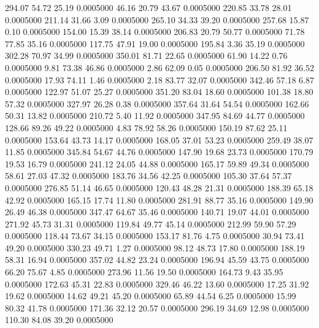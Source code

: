  294.07   54.72   25.19   0.0005000
  46.16   20.79   43.67   0.0005000
 220.85   33.78   28.01   0.0005000
 211.14   31.66    3.09   0.0005000
 265.10   34.33   39.20   0.0005000
 257.68   15.87    0.10   0.0005000
 154.00   15.39   38.14   0.0005000
 206.83   20.79   50.77   0.0005000
  71.78   77.85   35.16   0.0005000
 117.75   47.91   19.00   0.0005000
 195.84    3.36   35.19   0.0005000
 302.28   70.97   34.99   0.0005000
 350.01   81.71   22.65   0.0005000
  61.90   14.22    0.76   0.0005000
   9.81   73.38   46.86   0.0005000
   2.86   62.09    0.05   0.0005000
 206.50   81.92   36.52   0.0005000
  17.93   74.11    1.46   0.0005000
   2.18   83.77   32.07   0.0005000
 342.46   57.18    6.87   0.0005000
 122.97   51.07   25.27   0.0005000
 351.20   83.04   18.60   0.0005000
 101.38   18.80   57.32   0.0005000
 327.97   26.28    0.38   0.0005000
 357.64   31.64   54.54   0.0005000
 162.66   50.31   13.82   0.0005000
 210.72    5.40   11.92   0.0005000
 347.95   84.69   44.77   0.0005000
 128.66   89.26   49.22   0.0005000
   4.83   78.92   58.26   0.0005000
 150.19   87.62   25.11   0.0005000
 153.64   43.73   14.17   0.0005000
 168.05   37.01   53.23   0.0005000
 259.49   38.07   11.85   0.0005000
 345.84   54.67   44.76   0.0005000
 147.90   19.68   23.73   0.0005000
 170.79   19.53   16.79   0.0005000
 241.12   24.05   44.88   0.0005000
 165.17   59.89   49.34   0.0005000
  58.61   27.03   47.32   0.0005000
 183.76   34.56   42.25   0.0005000
 105.30   37.64   57.37   0.0005000
 276.85   51.14   46.65   0.0005000
 120.43   48.28   21.31   0.0005000
 188.39   65.18   42.92   0.0005000
 165.15   17.74   11.80   0.0005000
 281.91   88.77   35.16   0.0005000
 149.90   26.49   46.38   0.0005000
 347.47   64.67   35.46   0.0005000
 140.71   19.07   44.01   0.0005000
 271.92   45.73   31.31   0.0005000
 119.84   49.77   45.14   0.0005000
 212.99   59.90   57.29   0.0005000
 118.44   73.67   34.15   0.0005000
 153.17   81.76    4.75   0.0005000
  30.94   73.41   49.20   0.0005000
 330.23   49.71    1.27   0.0005000
  98.12   48.73   17.80   0.0005000
 188.19   58.31   16.94   0.0005000
 357.02   44.82   23.24   0.0005000
 196.94   45.59   43.75   0.0005000
  66.20   75.67    4.85   0.0005000
 273.96   11.56   19.50   0.0005000
 164.73    9.43   35.95   0.0005000
 172.63   45.31   22.83   0.0005000
 329.46   46.22   13.60   0.0005000
  17.25   31.92   19.62   0.0005000
  14.62   49.21   45.20   0.0005000
  65.89   44.54    6.25   0.0005000
  15.99   80.32   41.78   0.0005000
 171.36   32.12   20.57   0.0005000
 296.19   34.69   12.98   0.0005000
 110.30   84.08   39.20   0.0005000
